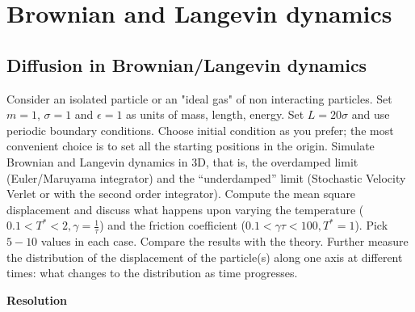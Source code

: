 \chapter{Brownian and Langevin dynamics}

\section{Diffusion in Brownian/Langevin dynamics}

Consider an isolated particle or an "ideal gas" of non interacting particles. Set $m = 1$, $\sigma = 1$ and $\epsilon = 1$ as units of mass, length, energy. Set $L = 20\sigma$ and use periodic boundary conditions. Choose initial condition as you prefer; the most convenient choice is to set all the starting positions in the origin. Simulate Brownian and Langevin dynamics in 3D, that is, the overdamped limit (Euler/Maruyama integrator) and the “underdamped” limit (Stochastic Velocity Verlet or with the second order integrator). Compute the mean square displacement and discuss what happens upon varying the temperature ($0.1 < T^* < 2, \gamma = \frac{1}{\tau}$) and the friction coefficient ($0.1 < \gamma \tau <100, T^* = 1$). Pick $5-10$ values in each case. Compare the results with the theory. Further measure the distribution of the displacement of the particle(s) along one axis at different times: what changes to the distribution as time progresses.

\textbf{Resolution}\\


